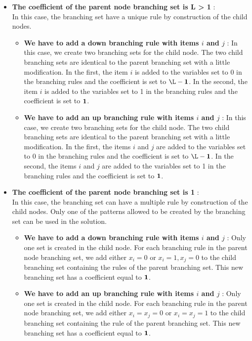 \begin{itemize}
	\item \textbf{The coefficient of the parent node branching set is L > 1} : \\
	In this case, the branching set have a unique rule by construction of the child nodes.
	\begin{itemize}
		\item \textbf{We have to add a down branching rule with items $i$ and $j$} : In this case, we create two branching sets for the child node. The two child branching sets are identical to the parent branching set with a little modification. In the first, the item $i$ is added to the variables set to 0 in the branching rules and the coefficient is set to $\L-\1$. In the second, the item $i$ is added to the variables set to 1 in the branching rules and the coefficient is set to ${\mathbf 1}$.
	\end{itemize}
	\begin{itemize}
		\item \textbf{We have to add an up branching rule with items $i$ and $j$} : In this case, we create two branching sets for the child node. The two child branching sets are identical to the parent branching set with a little modification. In the first, the items $i$ and $j$ are added to the variables set to 0 in the branching rules and the coefficient is set to $\L-\1$. In the second, the items $i$ and $j$ are added to the variables set to 1 in the branching rules and the coefficient is set to ${\mathbf 1}$.
	\end{itemize}
	\item \textbf{The coefficient of the parent node branching set is 1} : \\
	In this case, the branching set can have a multiple rule by construction of the child nodes. Only one of the patterns allowed to be created by the branching set can be used in the solution.
	\begin{itemize}
		\item \textbf{We have to add a down branching rule with items $i$ and $j$} : Only one set is created in the child node. For each branching rule in the parent node branching set, we add either $x_i = 0$ or $x_i=1, x_j=0$ to the child branching set containing the rules of the parent branching set. This new branching set has a coefficient equal to ${\mathbf 1}$.
	\end{itemize}
	\begin{itemize}
		\item \textbf{We have to add an up branching rule with items $i$ and $j$} : Only one set is created in the child node. For each branching rule in the parent node branching set, we add either $x_i = x_j = 0$ or $x_i=x_j=1$ to the child branching set containing the rule of the parent branching set. This new branching set has a coefficient equal to ${\mathbf 1}$.
	\end{itemize}
\end{itemize}

